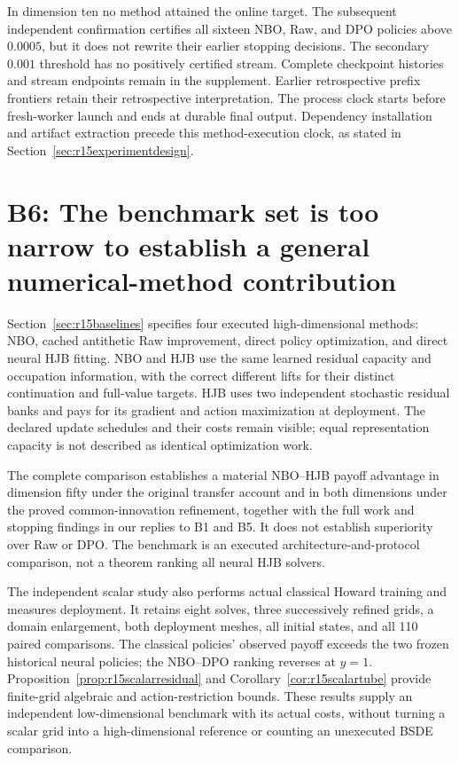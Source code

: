 In dimension ten no method attained the online target. The subsequent independent confirmation certifies all sixteen NBO, Raw, and DPO policies above $0.0005$, but it does not rewrite their earlier stopping decisions. The secondary $0.001$ threshold has no positively certified stream. Complete checkpoint histories and stream endpoints remain in the supplement. Earlier retrospective prefix frontiers retain their retrospective interpretation. The process clock starts before fresh-worker launch and ends at durable final output. Dependency installation and artifact extraction precede this method-execution clock, as stated in Section~\ref{sec:r15experimentdesign}.

\section*{B6: The benchmark set is too narrow to establish a general numerical-method contribution}
Section~\ref{sec:r15baselines} specifies four executed high-dimensional methods: NBO, cached antithetic Raw improvement, direct policy optimization, and direct neural HJB fitting. NBO and HJB use the same learned residual capacity and occupation information, with the correct different lifts for their distinct continuation and full-value targets. HJB uses two independent stochastic residual banks and pays for its gradient and action maximization at deployment. The declared update schedules and their costs remain visible; equal representation capacity is not described as identical optimization work.

The complete comparison establishes a material NBO--HJB payoff advantage in dimension fifty under the original transfer account and in both dimensions under the proved common-innovation refinement, together with the full work and stopping findings in our replies to B1 and B5. It does not establish superiority over Raw or DPO. The benchmark is an executed architecture-and-protocol comparison, not a theorem ranking all neural HJB solvers.

The independent scalar study also performs actual classical Howard training and measures deployment. It retains eight solves, three successively refined grids, a domain enlargement, both deployment meshes, all initial states, and all 110 paired comparisons. The classical policies' observed payoff exceeds the two frozen historical neural policies; the NBO--DPO ranking reverses at $y=1$. Proposition~\ref{prop:r15scalarresidual} and Corollary~\ref{cor:r15scalartube} provide finite-grid algebraic and action-restriction bounds. These results supply an independent low-dimensional benchmark with its actual costs, without turning a scalar grid into a high-dimensional reference or counting an unexecuted BSDE comparison.

